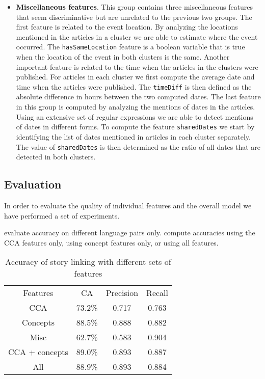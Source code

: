 \documentclass[twoside,11pt]{article}
\begin{document}
\begin{itemize}
\item {\bf Miscellaneous features}. This group contains three miscellaneous features that seem discriminative but are unrelated to the previous two groups. The first feature is related to the event location. By analyzing the locations mentioned in the articles in a cluster we are able to estimate where the event occurred. The \texttt{hasSameLocation} feature is a boolean variable that is true when the location of the event in both clusters is the same. Another important feature is related to the time when the articles in the clusters were published. For articles in each cluster we first compute the average date and time when the articles were published. The \texttt{timeDiff} is then defined as the absolute difference in hours between the two computed dates. The last feature in this group is computed by analyzing the mentions of dates in the articles. Using an extensive set of regular expressions we are able to detect mentions of dates in different forms. To compute the feature \texttt{sharedDates} we start by identifying the list of dates mentioned in articles in each cluster separately. The value of \texttt{sharedDates} is then determined as the ratio of all dates that are detected in both clusters.

\end{itemize}

\subsection{Evaluation}

In order to evaluate the quality of individual features and the overall model we have performed a set of experiments.

evaluate accuracy on different language pairs only. compute accuracies using the CCA features only, using concept features only, or using all features.

\begin{table}[h]
\caption{Accuracy of story linking with different sets of features}
\label{table:linkingEval}
\begin{center}
\begin{tabular}{|c|c|c|c|}
  \hline
  \cline{1-4}
  Features & CA & Precision & Recall \\ \cline{1-4}
  CCA & 73.2\% & 0.717 & 0.763 \\ \cline{1-4}
  Concepts & 88.5\% & 0.888 & 0.882 \\ \cline{1-4}
  Misc & 62.7\% & 0.583 & 0.904 \\ \cline{1-4}
  CCA + concepts & 89.0\% & 0.893 & 0.887 \\ \cline{1-4}
  All & 88.9\% & 0.893 & 0.884 \\ \cline{1-4}
  \hline
\end{tabular}
\end{center}
\end{table}
\end{document}
